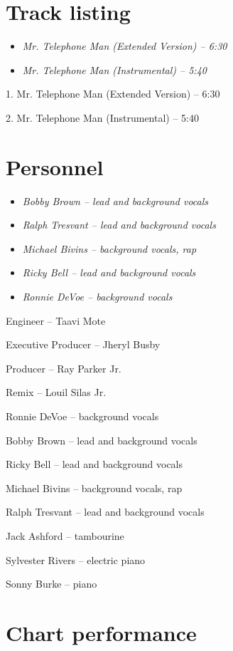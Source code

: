 \section{Track listing}\label{track-listing}

\begin{itemize}
\item
  \emph{Mr. Telephone Man (Extended Version) -- 6:30}
\item
  \emph{Mr. Telephone Man (Instrumental) -- 5:40}
\end{itemize}

1. Mr. Telephone Man (Extended Version) -- 6:30

2. Mr. Telephone Man (Instrumental) -- 5:40

\section{Personnel}\label{personnel}

\begin{itemize}
\item
  \emph{Bobby Brown -- lead and background vocals}
\item
  \emph{Ralph Tresvant -- lead and background vocals}
\item
  \emph{Michael Bivins -- background vocals, rap}
\item
  \emph{Ricky Bell -- lead and background vocals}
\item
  \emph{Ronnie DeVoe -- background vocals}
\end{itemize}

Engineer -- Taavi Mote

Executive Producer -- Jheryl Busby

Producer -- Ray Parker Jr.

Remix -- Louil Silas Jr.

Ronnie DeVoe -- background vocals

Bobby Brown -- lead and background vocals

Ricky Bell -- lead and background vocals

Michael Bivins -- background vocals, rap

Ralph Tresvant -- lead and background vocals

Jack Ashford -- tambourine

Sylvester Rivers -- electric piano

Sonny Burke -- piano

\section{Chart performance}\label{chart-performance}

